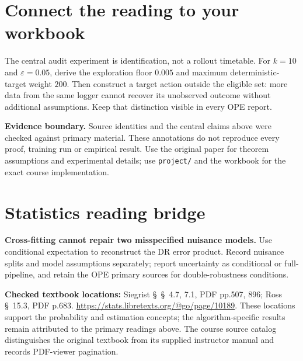 \documentclass[11pt]{scrartcl}
\begin{document}
\section*{Connect the reading to your workbook}
The central audit experiment is identification, not a rollout timetable. For $k=10$ and $\varepsilon=0.05$, derive the exploration floor $0.005$ and maximum deterministic-target weight $200$. Then construct a target action outside the eligible set: more data from the same logger cannot recover its unobserved outcome without additional assumptions. Keep that distinction visible in every OPE report.

\noindent\textbf{Evidence boundary.} Source identities and the central claims above were checked against primary material. These annotations do not reproduce every proof, training run or empirical result. Use the original paper for theorem assumptions and experimental details; use \texttt{project/} and the workbook for the exact course implementation.
\section*{Statistics reading bridge}
\textbf{Cross-fitting cannot repair two misspecified nuisance models.} Use conditional expectation to reconstruct the DR error product. Record nuisance splits and model assumptions separately; report uncertainty as conditional or full-pipeline, and retain the OPE primary sources for double-robustness conditions.

\textbf{Checked textbook locations:} Siegrist \S~\S~4.7, 7.1, PDF pp.507, 896; Ross \S~15.3, PDF p.683. \url{https://stats.libretexts.org/@go/page/10189}. These locations support the probability and estimation concepts; the algorithm-specific results remain attributed to the primary readings above. The course source catalog distinguishes the original textbook from its supplied instructor manual and records PDF-viewer pagination.
\end{document}
